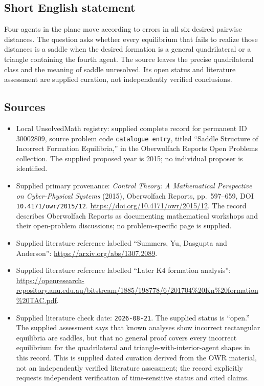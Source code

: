 \documentclass[11pt]{article}
\begin{document}
\subsection{Short English statement}
Four agents in the plane move according to errors in all six desired pairwise distances. The question asks whether every equilibrium that fails to realize those distances is a saddle when the desired formation is a general quadrilateral or a triangle containing the fourth agent. The source leaves the precise quadrilateral class and the meaning of saddle unresolved. Its open status and literature assessment are supplied curation, not independently verified conclusions.
\subsection{Sources}
\begin{itemize}
\item Local UnsolvedMath registry: supplied complete record for permanent ID \(30002809\), source problem code \texttt{catalogue entry}, titled ``Saddle Structure of Incorrect Formation Equilibria,'' in the Oberwolfach Reports Open Problems collection. The supplied proposed year is 2015; no individual proposer is identified.
\item Supplied primary provenance: \emph{Control Theory: A Mathematical Perspective on Cyber-Physical Systems} (2015), Oberwolfach Reports, pp.~597--659, DOI \texttt{10.4171/owr/2015/12}. \url{https://doi.org/10.4171/owr/2015/12}. The record describes Oberwolfach Reports as documenting mathematical workshops and their open-problem discussions; no problem-specific page is supplied.
\item Supplied literature reference labelled ``Summers, Yu, Dasgupta and Anderson'': \url{https://arxiv.org/abs/1307.2089}.
\item Supplied literature reference labelled ``Later K4 formation analysis'': \url{https://openresearch-repository.anu.edu.au/bitstream/1885/198778/6/201704\%20Kn\%20formation\%20TAC.pdf}.
\item Supplied literature check date: \texttt{2026-08-21}. The supplied status is ``open.'' The supplied assessment says that known analyses show incorrect rectangular equilibria are saddles, but that no general proof covers every incorrect equilibrium for the quadrilateral and triangle-with-interior-agent shapes in this record. This is supplied dated curation derived from the OWR material, not an independently verified literature assessment; the record explicitly requests independent verification of time-sensitive status and cited claims.
\end{itemize}
\end{document}

